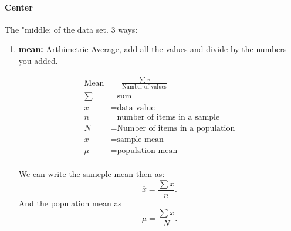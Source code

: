 \paragraph{Center}  The "middle: of the data set. 3 ways: 
\begin{enumerate}
    \item \textbf{mean:} Arthimetric Average, add all the values and divide by
        the numbers you added.

        \begin{align*}
            \text{Mean} &= \frac{\sum x}{\text{Number of values}} \\
            \sum &= \text{sum} \\
            x &= \text{data value} \\
            n &= \text{number of items in a sample} \\
            N &= \text{Number of items in a population} \\
            \overline{x} &= \text{sample mean} \\
            \mu &= \text{population mean} \\
        \end{align*}

        We can write the sameple mean then as: \[
        \overline{x} = \frac{\sum x}{n} .\] 
        And the population mean as \[
        \mu = \frac{\sum x}{N} .\] 




\end{enumerate}
